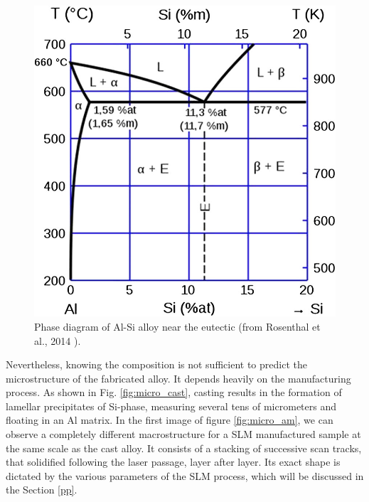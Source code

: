 \begin{figure}[ht]
	\centering
	\includegraphics[scale=0.35]{Images/phase_diagram}
	\decoRule
	\caption[Phase diagram of Al-Si alloy near the eutectic]{Phase diagram of Al-Si alloy near the eutectic (from Rosenthal et al., 2014 \parencite{Rosenthal14}).}
	\label{fig:phase_diagram}
\end{figure}

Nevertheless, knowing the composition is not sufficient to predict the microstructure of the fabricated alloy. It depends heavily on the manufacturing process.  As shown in Fig. \ref{fig:micro_cast}, casting results in the formation of lamellar precipitates of Si-phase, measuring several tens of micrometers and floating in an Al matrix. In the first image of figure \ref{fig:micro_am}, we can observe a completely different macrostructure for a SLM manufactured sample at the same scale as the cast alloy. It consists of a stacking of successive scan tracks, that solidified following the laser passage, layer after layer. Its exact shape is dictated by the various parameters of the SLM process, which will be discussed in the Section \ref{pp}.\\

